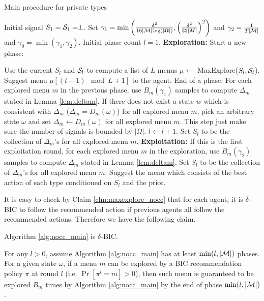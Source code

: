  \begin{algorithm}[t]
    \caption{Main procedure for private types }
    	\label{alg:nocc_main}
    \begin{algorithmic}[1]
    	\STATE Initial signal $S_1 = \S_1= \perp$.
    	\STATE Set $\gamma_1 =\min\left(\frac{\delta^2}{16|\M|\log(|\varOmega|)},\left( \frac{\delta^2}{32|M|}\right)^2\right)$ and $\gamma_2 =  \frac{1}{T|\M|}$ and $\gamma_0=\min(\gamma_1,\gamma_2)$.
	\STATE Initial phase count $l = 1$.
		\STATE \textbf{Exploration:}
			\STATE Start a new phase:
			
			\STATE Use the current $S_l$ and $\S_l$ to compute a list of $L$ menus $\mu \leftarrow $ MaxExplore($S_l, \S_l$).
		\ENDIF
		\STATE Suggest menu $\mu [ (t-1) \mod L + 1]$ to the agent.
			\STATE End of a phase:
			\STATE For each explored menu $m$ in the previous phase, use $B_m(\gamma_1)$ samples to compute $\Delta_m$ stated in Lemma \ref{lem:deltam}.
			\STATE If there does not exist a state $w$ which is consistent with $\Delta_m$ ($\Delta_m = D_m(\omega)$) for all explored menu $m$, pick an arbitrary state $\omega$ and set $\Delta_m \leftarrow D_m(\omega)$ for all explored menu $m$. This step just make sure the number of signals is bounded by $|\varOmega|$.
			\STATE $l \leftarrow l + 1$.
			\STATE Set $S_l$ to be the collection of $\Delta_m$'s for all explored menu $m$.
		\ENDIF
	\ELSE
		\STATE \textbf{Exploitation:}
		\STATE If this is the first exploitation round, for each explored menu $m$ in the exploration, use $B_m(\gamma_2)$ samples to compute $\Delta_m$ stated in Lemma \ref{lem:deltam}. Set $S_l$ to be the collection of $\Delta_m$'s for all explored menu $m$.
		\STATE Suggest the menu which consists of the best action of each type conditioned on $S_l$ and the prior.
	\ENDIF
	\ENDFOR
     \end{algorithmic}
\end{algorithm}

It is easy to check by Claim \ref{clm:maxexplore_nocc} that for each agent, it is $\delta$-BIC to follow the recommended action if previous agents all follow the recommended actions. Therefore we have the following claim.
\begin{claim}
\label{clm:nocc_BIC}
Algorithm \ref{alg:nocc_main} is $\delta$-BIC.
\end{claim}


\begin{lemma}
\label{lem:exp_nocc}
For any $l > 0$, assume Algorithm \ref{alg:nocc_main} has at least $\min(l, |\M|)$ phases.
For a given state $\omega$, if a menu $m$ can be explored by a BIC recommendation policy $\pi$ at round $l$ (i.e. $ \Pr[\pi^l= m]> 0$), then such menu is guaranteed to be explored $B_m$ times by Algorithm \ref{alg:nocc_main} by the end of phase $\min(l, |\M|)$.
\end{lemma}

